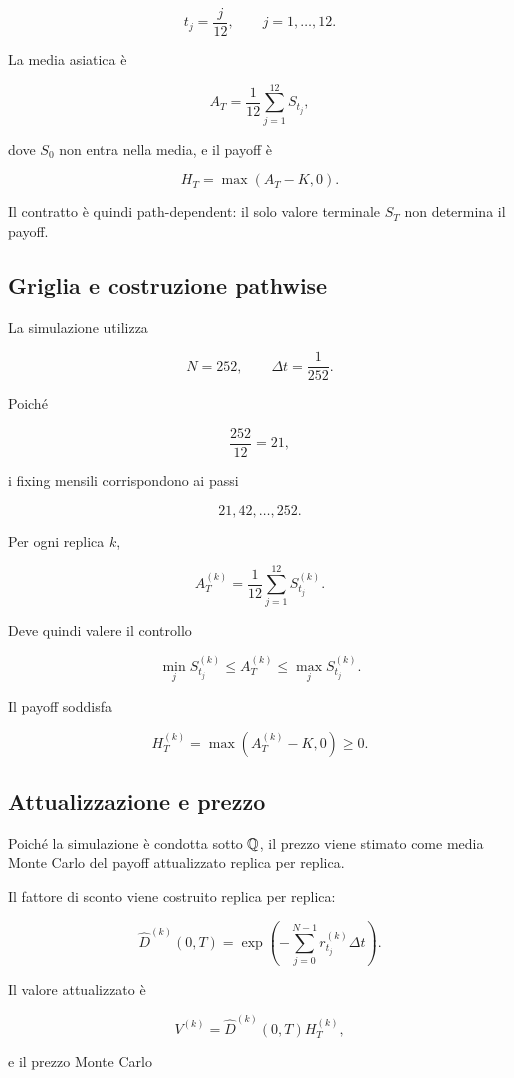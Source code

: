 \[
t_j=\frac{j}{12},
\qquad
j=1,\ldots,12.
\]

La media asiatica \`e

\[
A_T
=
\frac{1}{12}
\sum_{j=1}^{12}
S_{t_j},
\]

\noindent dove \(S_0\) non entra nella media, e il payoff \`e

\[
H_T
=
\max(A_T-K,0).
\]

Il contratto \`e quindi path-dependent: il solo valore terminale \(S_T\) non
determina il payoff.

\subsection{Griglia e costruzione pathwise}

La simulazione utilizza

\[
N=252,
\qquad
\Delta t=\frac{1}{252}.
\]

Poich\'e

\[
\frac{252}{12}=21,
\]

\noindent i fixing mensili corrispondono ai passi

\[
21,42,\ldots,252.
\]

Per ogni replica \(k\),

\[
A_T^{(k)}
=
\frac{1}{12}
\sum_{j=1}^{12}
S_{t_j}^{(k)}.
\]

Deve quindi valere il controllo

\[
\min_j S_{t_j}^{(k)}
\leq
A_T^{(k)}
\leq
\max_j S_{t_j}^{(k)}.
\]

Il payoff soddisfa

\[
H_T^{(k)}
=
\max(A_T^{(k)}-K,0)
\geq0.
\]

\subsection{Attualizzazione e prezzo}

Poich\'{e} la simulazione \`{e} condotta sotto $\mathbb{Q}$, il prezzo viene
stimato come media Monte Carlo del payoff attualizzato replica per replica.

Il fattore di sconto viene costruito replica per replica:

\[
\widehat D^{(k)}(0,T)
=
\exp\left(
-
\sum_{j=0}^{N-1}
r_{t_j}^{(k)}\Delta t
\right).
\]

Il valore attualizzato \`e

\[
V^{(k)}
=
\widehat D^{(k)}(0,T)
H_T^{(k)},
\]

\noindent e il prezzo Monte Carlo

